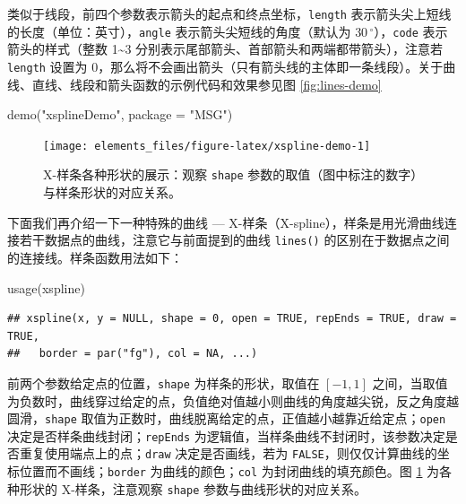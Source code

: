 \documentclass[
  b5paper,
  UTF8,twoside]{book}
\newenvironment{Shaded}{\begin{snugshade}}{\end{snugshade}}
\newcommand{\AttributeTok}[1]{\textcolor[rgb]{0.77,0.63,0.00}{#1}}
\newcommand{\FunctionTok}[1]{\textcolor[rgb]{0.00,0.00,0.00}{#1}}
\newcommand{\NormalTok}[1]{#1}
\newcommand{\StringTok}[1]{\textcolor[rgb]{0.31,0.60,0.02}{#1}}
\begin{document}
类似于线段，前四个参数表示箭头的起点和终点坐标，\texttt{length} 表示箭头尖上短线的长度（单位：英寸），\texttt{angle} 表示箭头尖短线的角度（默认为 \(30\,^{\circ}\)），\texttt{code} 表示箭头的样式（整数 1\textasciitilde3 分别表示尾部箭头、首部箭头和两端都带箭头），注意若 \texttt{length} 设置为 0，那么将不会画出箭头（只有箭头线的主体即一条线段）。关于曲线、直线、线段和箭头函数的示例代码和效果参见图 \ref{fig:lines-demo}

\begin{Shaded}
\begin{Highlighting}[]
\FunctionTok{demo}\NormalTok{(}\StringTok{"xsplineDemo"}\NormalTok{, }\AttributeTok{package =} \StringTok{"MSG"}\NormalTok{)}
\end{Highlighting}
\end{Shaded}

\begin{figure}

{\centering \texttt{[image: elements\_files/figure-latex/xspline-demo-1]} 

}

\caption[X-样条各种形状的展示]{X-样条各种形状的展示：观察 \texttt{shape} 参数的取值（图中标注的数字）与样条形状的对应关系。}\label{fig:xspline-demo}
\end{figure}





下面我们再介绍一下一种特殊的曲线 --- X-样条（X-spline），样条是用光滑曲线连接若干数据点的曲线，注意它与前面提到的曲线 \texttt{lines()} 的区别在于数据点之间的连接线。样条函数用法如下：

\begin{Shaded}
\begin{Highlighting}[]
\FunctionTok{usage}\NormalTok{(xspline)}
\end{Highlighting}
\end{Shaded}

\begin{verbatim}
## xspline(x, y = NULL, shape = 0, open = TRUE, repEnds = TRUE, draw = TRUE,
##   border = par("fg"), col = NA, ...)
\end{verbatim}

前两个参数给定点的位置，\texttt{shape} 为样条的形状，取值在 \([-1, 1]\) 之间，当取值为负数时，曲线穿过给定的点，负值绝对值越小则曲线的角度越尖锐，反之角度越圆滑，\texttt{shape} 取值为正数时，曲线脱离给定的点，正值越小越靠近给定点；\texttt{open} 决定是否样条曲线封闭；\texttt{repEnds} 为逻辑值，当样条曲线不封闭时，该参数决定是否重复使用端点上的点；\texttt{draw} 决定是否画线，若为 \texttt{FALSE}，则仅仅计算曲线的坐标位置而不画线；\texttt{border} 为曲线的颜色；\texttt{col} 为封闭曲线的填充颜色。图 \ref{fig:xspline-demo} 为各种形状的 X-样条，注意观察 \texttt{shape} 参数与曲线形状的对应关系。
\end{document}
